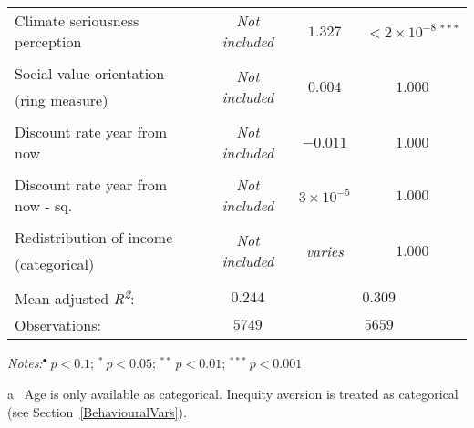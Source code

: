 \documentclass[a4paper,12pt]{article}
\begin{document}
{\begin{threeparttable}
\begin{small}
\begin{tabular}{lcccc}
      \\
    \vspace{-0.32cm}Climate seriousness perception&\multicolumn{2}{c}{\textit{Not included}}&$1.327$&$<2\times10^{-8}~^{***}$\\
           \\
Social value orientation&\multicolumn{2}{c}{\multirow{2}{*}{\textit{Not included}}}&\multirow{2}{*}{$0.004$}&\multirow{2}{*}{$1.000$}\\
\vspace{-0.32cm} \hspace{0.6cm}(ring measure)&&&\\ 
      \\
 \vspace{-0.32cm}Discount rate year from now&\multicolumn{2}{c}{\textit{Not included}}&\multirow{1}{*}{$-0.011$}&\multirow{1}{*}{$1.000$}\\     \\     
 \vspace{-0.32cm}Discount rate year from now - sq.\tnote{b}&\multicolumn{2}{c}{\textit{Not included}}&\multirow{1}{*}{$3\times10^{-5}$}&\multirow{1}{*}{$1.000$}\\     
      \\
Redistribution of income&\multicolumn{2}{c}{\multirow{2}{*}{\textit{Not included}}}&\multirow{2}{*}{\textit{varies}}&\multirow{2}{*}{$1.000$}\\
\vspace{-0.32cm} \hspace{0.6cm}(categorical)\tnote{c}&&&\\
  \\    
     \hline
Mean adjusted \textit{R\textsuperscript2}:&\multicolumn{2}{c}{$0.244$}&\multicolumn{2}{c}{$0.309$}\\    
  Observations: &\multicolumn{2}{c}{$5749$}&\multicolumn{2}{c}{$5659$}
\\
\hline
\end{tabular} 
\end{small}
 \begin{tablenotes}
  \begin{footnotesize}
 \item \textit{Notes:}\hspace{0.2cm}$^{\bullet}~p<0.1$; $^{*}~p<0.05$; $^{**}~p<0.01$; $^{***}~p<0.001$
 \begin{adjustwidth}{0.9cm}{}
  \vspace{-0.2cm}
\item[a]~Age is only available as categorical. Inequity aversion is treated as categorical (see Section~\ref{BehaviouralVars}).

\end{adjustwidth}
\end{footnotesize}
\end{tablenotes}
\end{threeparttable}}
\end{document}
